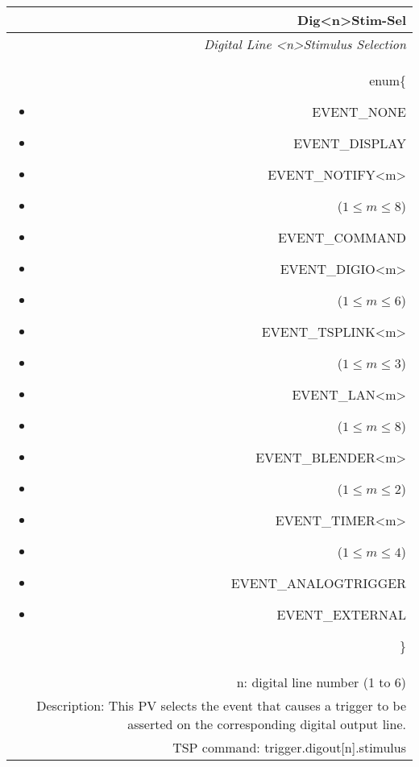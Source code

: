 \documentclass[openany]{article}
\begin{document}
		\begin{tabular}{N}
			\hline
			\bfseries Dig{\textless n\textgreater}Stim-Sel\label{pv:digstim-sel} \\ \hline
			\emph{Digital Line \textless n\textgreater Stimulus Selection} \\
			enum\{\begin{itemize}[noitemsep]
				\small
				\item[] EVENT\_NONE
				\item[] EVENT\_DISPLAY
				\item[] EVENT\_NOTIFY\textless m\textgreater
				\item[] ($1\leq m\leq 8$)
				\item[] EVENT\_COMMAND
				\item[] EVENT\_DIGIO\textless m\textgreater
				\item[] ($1\leq m\leq 6$)
				\item[] EVENT\_TSPLINK\textless m\textgreater
				\item[] ($1\leq m\leq 3$)
				\item[] EVENT\_LAN\textless m\textgreater
				\item[] ($1\leq m\leq 8$)
				\item[] EVENT\_BLENDER\textless m\textgreater 
				\item[] ($1\leq m\leq 2$)
				\item[] EVENT\_TIMER\textless m\textgreater
				\item[] ($1\leq m\leq 4$)
				\item[] EVENT\_ANALOGTRIGGER
				\item[] EVENT\_EXTERNAL
			\end{itemize}\} \\
			n: digital line number (1 to 6) \\
			Description: This PV selects the event that causes a trigger to be asserted on the corresponding digital output line. \\
			TSP command: trigger.digout[n].stimulus
		\end{tabular}
\end{document}
